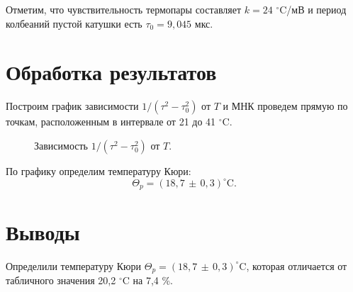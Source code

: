\documentclass[a4paper,12pt]{article} %
\begin{document}
	Отметим, что чувствительность термопары составляет $k = 24$ $^\circ$C/мВ и период колбеаний пустой катушки есть $\tau_0 = 9,045$ мкс.
		
\newpage
\section {Обработка результатов}
	Построим график зависимости  $1/ (\tau^2 - \tau_0^2)$ от $T$ и МНК проведем прямую по точкам, расположенным в интервале от 21 до 41 $^\circ$C.
	\begin{figure}[H]
		\caption{Зависимость $1/ (\tau^2 - \tau_0^2)$ от $T$.}
		\label{ris:B=f(I)}
	\end{figure}

По графику определим температуру Кюри:
\[
	\boxed{\Theta_p = (18,7 \, \pm \, 0,3)^\circ \text{C}.}
\]
	
\section{Выводы}
	Определили температуру Кюри $\Theta_p = (18,7 \, \pm \, 0,3)^\circ \text{C}$, которая отличается от табличного значения 20,2 $^\circ$C на 7,4 \%.
\end{document}
